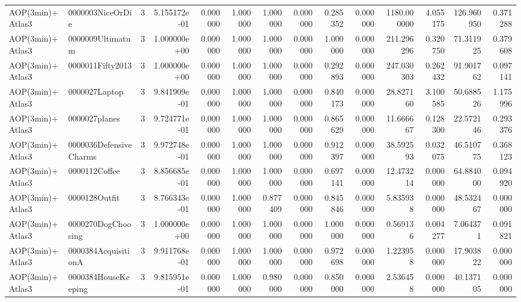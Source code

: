 \begin{tabular}{llrr|r|rr|rr|rr|rrr}
         AOP(3min)+Atlas3 &       0000003NiceOrDie &       3 & 5.155172e-01 & 0.000000 & 1.000000 &      1.000000 & 0.000000 &      0.285352 & 0.000000 &   1180.000000 &    4.055175 &   126.960950 &    0.371288 \\
         AOP(3min)+Atlas3 &       0000009Ultimatum &       3 & 1.000000e+00 & 0.000000 & 1.000000 &      1.000000 & 0.000000 &      1.000000 & 0.000000 &    211.296296 &    0.320750 &    71.311925 &    0.379608 \\
         AOP(3min)+Atlas3 &       0000011Fifty2013 &       3 & 1.000000e+00 & 0.000000 & 1.000000 &      1.000000 & 0.000000 &      0.292893 & 0.000000 &    247.030303 &    0.262432 &    91.901762 &    0.097141 \\
         AOP(3min)+Atlas3 &          0000027Laptop &       3 & 9.841909e-01 & 0.000000 & 1.000000 &      1.000000 & 0.000000 &      0.840173 & 0.000000 &     28.827160 &    3.100585 &    50.688526 &    1.175996 \\
         AOP(3min)+Atlas3 &          0000027planes &       3 & 9.724771e-01 & 0.000000 & 1.000000 &      1.000000 & 0.000000 &      0.865629 & 0.000000 &     11.666667 &    0.128300 &    22.572146 &    0.293376 \\
         AOP(3min)+Atlas3 & 0000036DefensiveCharms &       3 & 9.972748e-01 & 0.000000 & 1.000000 &      1.000000 & 0.000000 &      0.912397 & 0.000000 &     38.592593 &    0.032075 &    46.510775 &    0.368123 \\
         AOP(3min)+Atlas3 &          0000112Coffee &       3 & 8.856685e-01 & 0.000000 & 1.000000 &      1.000000 & 0.000000 &      0.697141 & 0.000000 &     12.473214 &    0.000000 &    64.884000 &    0.094920 \\
         AOP(3min)+Atlas3 &          0000128Outfit &       3 & 8.766343e-01 & 0.000000 & 1.000000 &      0.877409 & 0.000000 &      0.845846 & 0.000000 &      5.835938 &    0.000000 &    48.532467 &    0.000000 \\
         AOP(3min)+Atlas3 &     0000270DogChoosing &       3 & 1.000000e+00 & 0.000000 & 1.000000 &      1.000000 & 0.000000 &      1.000000 & 0.000000 &      0.569136 &    0.004277 &     7.064371 &    0.091821 \\
         AOP(3min)+Atlas3 &    0000384AcquisitionA &       3 & 9.911768e-01 & 0.000000 & 1.000000 &      1.000000 & 0.000000 &      0.972698 & 0.000000 &      1.223958 &    0.000000 &    17.903822 &    0.000000 \\
         AOP(3min)+Atlas3 &    0000384HouseKeeping &       3 & 9.815951e-01 & 0.000000 & 1.000000 &      0.980000 & 0.000000 &      0.850000 & 0.000000 &      2.536458 &    0.000000 &    40.137105 &    0.000000 \\

\end{tabular}
